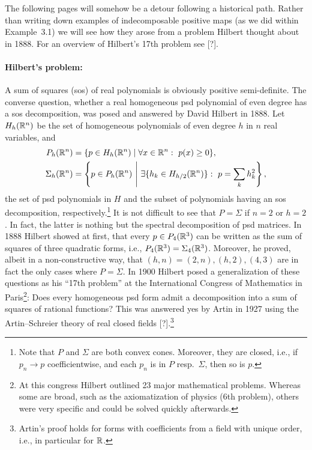 \documentclass[11pt,a4paper]{article}
\numberwithin{equation}{section}
\begin{document}
The following pages will somehow be a detour following a historical path. Rather than writing down examples of
indecomposable positive maps (as we did within Example~3.1) we will see how they arose from a problem Hilbert thought
about in 1888. For an overview of Hilbert's 17th problem see [?].

\paragraph{Hilbert's problem:}
A sum of squares (sos) of real polynomials is obviously positive semi-definite. The converse question, whether a real
homogeneous psd polynomial of even degree has a sos decomposition, was posed and answered by David Hilbert in 1888.
Let $H_h(\mathbb{R}^n)$ be the set of homogeneous polynomials of even degree $h$ in $n$ real variables, and
\begin{align}
    P_h(\RR^n)      &= \{p\in H_h(\RR^n)\mid \forall x\in \RR^n:\ p(x)\ge 0\},
    \label{eq:ch3:3.31}
    \\
    \Sigma_h(\RR^n) &=
    \left\{p\in P_h(\RR^n)\ \middle|\ \exists\{h_k\in H_{h/2}(\RR^n)\}:\ p=\sum_k h_k^2\right\},
    \label{eq:ch3:3.32}
\end{align}
the set of psd polynomials in $H$ and the subset of polynomials having an sos decomposition, respectively.\footnote{Note
    that $P$ and $\Sigma$ are both convex cones. Moreover, they are closed, i.e., if $p_n\to p$ coefficientwise, and each
    $p_n$ is in $P$ resp.\ $\Sigma$, then so is $p$.} It is not difficult to see that $P=\Sigma$ if $n=2$ or $h=2$. In
fact, the latter is nothing but the spectral decomposition of psd matrices. In 1888 Hilbert showed at first, that
every $p\in P_4(\mathbb{R}^3)$ can be written as the sum of squares of three quadratic forms, i.e., $P_4(\mathbb{R}^3)=\Sigma_4(\mathbb{R}^3)$.
Moreover, he proved, albeit in a non-constructive way, that $(h,n)=(2,n),(h,2),(4,3)$ are in fact the only cases where
$P=\Sigma$. In 1900 Hilbert posed a generalization of these questions as his ``17th problem'' at the International
Congress of Mathematics in Paris\footnote{At this congress Hilbert outlined 23 major mathematical problems. Whereas
    some are broad, such as the axiomatization of physics (6th problem), others were very specific and could be solved
    quickly afterwards.}: Does every homogeneous psd form admit a decomposition into a sum of squares of rational
functions? This was answered yes by Artin in 1927 using the Artin--Schreier theory of real closed
fields [?].\footnote{Artin's proof holds for forms with coefficients from a field with unique order, i.e., in
    particular for $\mathbb{R}$.}
\end{document}
